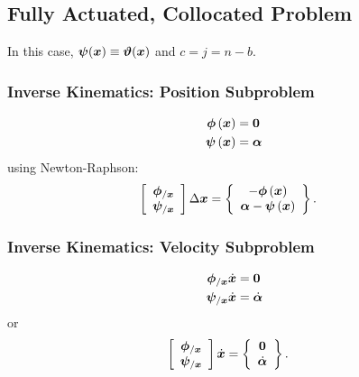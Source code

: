 \subsection{Fully Actuated, Collocated Problem}
\label{sec:id:facp}
In this case, $\bm{\psi}(\bm{x}) \equiv \bm{\vartheta}(\bm{x})$
and $c = j = n - b$.

\subsubsection{Inverse Kinematics: Position Subproblem}
\begin{subequations}
\begin{align}
	\bm{\phi}\left( \bm{x} \right)
	&=
	\bm{0}
	\\
	\bm{\psi}\left( \bm{x} \right)
	&=
	\bm{\alpha}
\end{align}
\end{subequations}
using Newton-Raphson:
\begin{align}
	\left[ \begin{array}{c} 
		\bm{\phi}_{/\bm{x}}
		\\
		\bm{\psi}_{/\bm{x}}
	 \end{array} \right] \Delta\bm{x}
	&=
	\left\{ \begin{array}{c} 
		-\bm{\phi}\left( \bm{x} \right)
		\\
		\bm{\alpha}
		-
		\bm{\psi}\left( \bm{x} \right)
	 \end{array} \right\}
	.
\end{align}

\subsubsection{Inverse Kinematics: Velocity Subproblem}
\begin{subequations}
\begin{align}
	\bm{\phi}_{/\bm{x}} \dot{\bm{x}}
	&=
	\bm{0}
	\\
	\bm{\psi}_{/\bm{x}} \dot{\bm{x}}
	&=
	\dot{\bm{\alpha}}
\end{align}
\end{subequations}
or
\begin{align}
	\left[ \begin{array}{c} 
		\bm{\phi}_{/\bm{x}}
		\\
		\bm{\psi}_{/\bm{x}}
	 \end{array} \right] \dot{\bm{x}}
	&=
	\left\{ \begin{array}{c} 
		\bm{0}
		\\
		\dot{\bm{\alpha}}
	 \end{array} \right\}
	.
\end{align}

